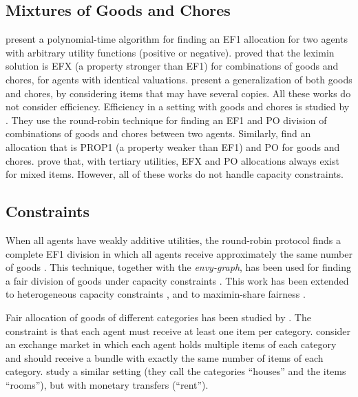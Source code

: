 \documentclass[sigconf]{aamas}
\theoremstyle{definition}
\begin{document}
\subsection{Mixtures of Goods and Chores}

\citet{Brczi2020} present a polynomial-time algorithm for finding an EF1 allocation for two agents with arbitrary utility functions (positive or negative).
\citet{Chen2020} proved that the leximin solution is EFX (a property stronger than EF1) for combinations of goods and chores, for agents with identical valuations.
\citet{gafni2021unified} 
present a generalization of both goods and chores, by considering items that may have several copies.
All these works do not consider efficiency.
Efficiency in a setting with goods and chores is studied by \citet{aziz2022fair}. They use the round-robin technique for finding an EF1 and PO division of combinations of goods and chores between two agents.
Similarly, \citet{aziz2020polynomial} find an allocation that is PROP1 (a property weaker than EF1) and PO for goods and chores.
\citet{aleksandrov2019greedy} 
prove that, with tertiary utilities, EFX and PO allocations always exist for mixed items.
However, all of these works do not handle capacity constraints.

\subsection{Constraints}
When all agents have weakly additive utilities, the round-robin protocol finds a complete EF1 division in which all agents receive approximately the same number of goods \cite{caragiannis2016}. 
This technique, together with the \emph{envy-graph}, has been used for finding a fair division of goods under capacity constraints \cite{biswas2018}.
This work has been extended to heterogeneous capacity constraints \cite{dror2021fair}, 
and to maximin-share fairness \cite{hummel2021guaranteeing}.

Fair allocation of goods of different categories has been studied by
\citet{mackin2016allocating}. The constraint is that each agent must receive at least one item per category. 
\citet{sikdar2019mechanism} consider an exchange market in which each agent holds multiple items of each category and should receive a bundle with exactly the same number of items of each category.
\citet{nyman2020fair} study a similar setting (they call the categories ``houses'' and the items ``rooms''), but with monetary transfers (``rent'').
\end{document}
